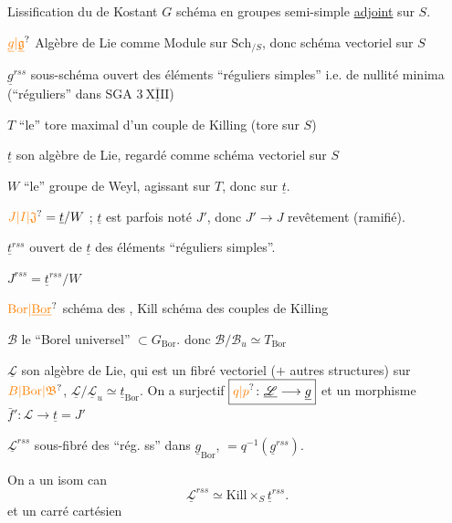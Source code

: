 Lissification du  de Kostant
$G$ schéma en groupes semi-simple \uline{adjoint} sur $S$.

$\unsure{\underline{g}|\underline{\mathfrak g}}$ Algèbre de Lie comme Module sur $\mathrm{Sch}_{/S}$, donc schéma vectoriel sur $S$

$\underline{g}^{rss}$ sous-schéma ouvert des éléments ``réguliers simples'' i.e. de nullité minima (``réguliers'' dans SGA $3\ \overline{\underline{\mathrm{XIII}}}$)

$T$ ``le'' tore maximal d'un couple de Killing (tore sur $S$)

$\underline t$ son algèbre de Lie, regardé comme schéma vectoriel sur $S$

$W$ ``le'' groupe de Weyl, agissant sur $T$, donc sur $\underline t$.

$\unsure{J|I|\mathfrak J}=\underline t/W$ ; $\underline t$ est parfois noté $J'$, donc $J'\longrightarrow J$ revêtement (ramifié).

$\underline t^{rss}$ ouvert de $\underline t$ des éléments ``réguliers simples''.


$J^{rss}=\underline t^{rss}/W$

$\unsure{\mathrm{Bor}|\underline{\mathrm{Bor}}}$ schéma des ,  $\mathrm{Kill}$ schéma des couples de Killing

$\mathscr B$ le ``Borel universel'' $\subset G_{\mathrm{Bor}}$. donc $\mathscr B/\mathscr B_u\simeq T_{\mathrm{Bor}}$

$\underline{\mathscr L}$ son algèbre de Lie, qui est un fibré vectoriel ($+$ autres structures) sur $\unsure{B|\mathrm{Bor}|\mathfrak B}$, $\underline{\mathscr L}/\underline{\mathscr L}_u\simeq\underline t_{\mathrm{Bor}}$. On a  surjectif $\boxed{\unsure{q|p}\colon\underline{\mathscr L}\longrightarrow\underline g}$ et un morphisme $\boxed{\bar f'\colon\mathscr L\longrightarrow\underline t=J'}$

$\underline{\mathscr L}^{rss}$ sous-fibré des  ``rég. ss'' dans $\underline g_{\mathrm{Bor}}$,
$=q^{-1}(\underline g^{rss})$.

On a un isom can
\[
\underline{\mathscr L}^{rss}\simeq \mathrm{Kill}\times_S\underline t^{rss}.
\]
et un carré cartésien

